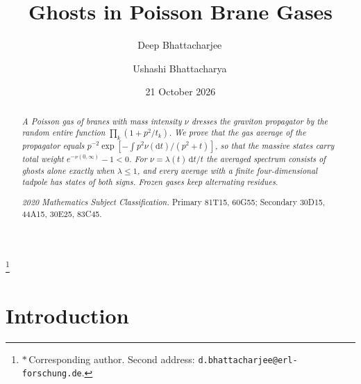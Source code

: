 \documentclass[aps,prd,twocolumn,superscriptaddress,nofootinbib,longbibliography,floatfix,amsmath,amssymb,10pt]{revtex4-2}
\theoremstyle{definition}
\theoremstyle{remark}
\newcommand{\dd}{\mathrm{d}}
\begin{document}
\title{Ghosts in Poisson Brane Gases}

\author{Deep Bhattacharjee\,}
\thanks{$*$\,Corresponding author. Second address:
\nolinkurl{d.bhattacharjee@erl-forschung.de}.}

\author{Ushashi Bhattacharya\,}

\date{21 October 2026}

\begin{abstract}
\itshape
A Poisson gas of branes with mass intensity $\nu$ dresses the graviton
propagator by the random entire function $\prod_k(1+p^2/t_k)$. We prove that
the gas average of the propagator equals
$p^{-2}\exp[-\int p^2\nu(\dd t)/(p^2+t)]$, so that the massive states carry
total weight $e^{-\nu(0,\infty)}-1<0$. For $\nu=\lambda(t)\,\dd t/t$ the
averaged spectrum consists of ghosts alone exactly when $\lambda\le1$, and
every average with a finite four-dimensional tadpole has states of both
signs. Frozen gases keep alternating residues.
\par\medskip\upshape\noindent
\textit{2020 Mathematics Subject Classification.} Primary 81T15, 60G55;
Secondary 30D15, 44A15, 30E25, 83C45.
\end{abstract}


\maketitle

\makeatletter
\renewcommand\l@subsection[2]{}
\renewcommand\l@subsubsection[2]{}
\makeatother
\tableofcontents

\section{Introduction}\label{sec:intro}
\end{document}
